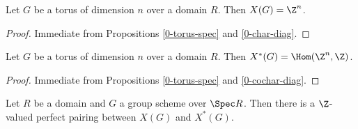 \begin{proposition}
  \label{0-char-torus}

  Let $G$ be a torus of dimension $n$ over a domain $R$.
  Then $X(G) = \Z^n$.
\end{proposition}
\begin{proof}

  Immediate from Propositions \ref{0-torus-spec} and \ref{0-char-diag}.
\end{proof}


\begin{proposition}
  \label{0-cochar-torus}

  Let $G$ be a torus of dimension $n$ over a domain $R$.
  Then $X^*(G) = \Hom(\Z^n, \Z)$.
\end{proposition}
\begin{proof}

  Immediate from Propositions \ref{0-torus-spec} and \ref{0-cochar-diag}.
\end{proof}


\begin{definition}
  \label{0-char-cochar-pairing}

  Let $R$ be a domain and $G$ a group scheme over $\Spec R$.
  Then there is a $\Z$-valued perfect pairing between $X(G)$ and $X^*(G)$.
\end{definition}
